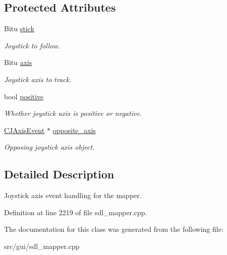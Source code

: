 \subsection*{Protected Attributes}
\begin{DoxyCompactItemize}
\item 
\hypertarget{classCJAxisEvent_a4445db17f0538358d815ab53d449beba}{Bitu \hyperlink{classCJAxisEvent_a4445db17f0538358d815ab53d449beba}{stick}}\label{classCJAxisEvent_a4445db17f0538358d815ab53d449beba}

\begin{DoxyCompactList}\small\item\em Joystick to follow. \end{DoxyCompactList}\item 
\hypertarget{classCJAxisEvent_aef7080ddb8c0a07235865f4f8f33bf90}{Bitu \hyperlink{classCJAxisEvent_aef7080ddb8c0a07235865f4f8f33bf90}{axis}}\label{classCJAxisEvent_aef7080ddb8c0a07235865f4f8f33bf90}

\begin{DoxyCompactList}\small\item\em Joystick axis to track. \end{DoxyCompactList}\item 
\hypertarget{classCJAxisEvent_a90367a0731415ea7dd7b3d01fa153367}{bool \hyperlink{classCJAxisEvent_a90367a0731415ea7dd7b3d01fa153367}{positive}}\label{classCJAxisEvent_a90367a0731415ea7dd7b3d01fa153367}

\begin{DoxyCompactList}\small\item\em Whether joystick axis is positive or negative. \end{DoxyCompactList}\item 
\hypertarget{classCJAxisEvent_aef506ec736efabf7a118af104921a998}{\hyperlink{classCJAxisEvent}{C\-J\-Axis\-Event} $\ast$ \hyperlink{classCJAxisEvent_aef506ec736efabf7a118af104921a998}{opposite\-\_\-axis}}\label{classCJAxisEvent_aef506ec736efabf7a118af104921a998}

\begin{DoxyCompactList}\small\item\em Opposing joystick axis object. \end{DoxyCompactList}\end{DoxyCompactItemize}


\subsection{Detailed Description}
Joystick axis event handling for the mapper. 

Definition at line 2219 of file sdl\-\_\-mapper.\-cpp.



The documentation for this class was generated from the following file\-:\begin{DoxyCompactItemize}
\item 
src/gui/sdl\-\_\-mapper.\-cpp\end{DoxyCompactItemize}

